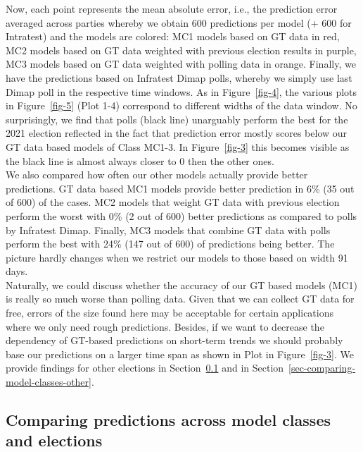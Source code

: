 \documentclass[
  letterpaper,
  DIV=11,
  numbers=noendperiod]{scrartcl}
\begin{document}
Now, each point represents the mean absolute error, i.e., the prediction
error averaged across parties whereby we obtain 600 predictions per
model (+ 600 for Intratest) and the models are colored: MC1 models based
on GT data in red, MC2 models based on GT data weighted with previous
election results in purple, MC3 models based on GT data weighted with
polling data in orange. Finally, we have the predictions based on
Infratest Dimap polls, whereby we simply use last Dimap poll in the
respective time windows. As in Figure~\ref{fig-4}, the various plots in
Figure~\ref{fig-5} (Plot 1-4) correspond to different widths of the data
window. No surprisingly, we find that polls (black line) unarguably
perform the best for the 2021 election reflected in the fact that
prediction error mostly scores below our GT data based models of Class
MC1-3. In Figure~\ref{fig-3} this becomes visible as the black line is
almost always closer to 0 then the other ones.\\
We also compared how often our other models actually provide better
predictions. GT data based MC1 models provide better prediction in 6\%
(35 out of 600) of the cases. MC2 models that weight GT data with
previous election perform the worst with 0\% (2 out of 600) better
predictions as compared to polls by Infratest Dimap. Finally, MC3 models
that combine GT data with polls perform the best with 24\% (147 out of
600) of predictions being better. The picture hardly changes when we
restrict our models to those based on width 91 days.\\
Naturally, we could discuss whether the accuracy of our GT based models
(MC1) is really so much worse than polling data. Given that we can
collect GT data for free, errors of the size found here may be
acceptable for certain applications where we only need rough
predictions. Besides, if we want to decrease the dependency of GT-based
predictions on short-term trends we should probably base our predictions
on a larger time span as shown in Plot in Figure~\ref{fig-3}. We provide
findings for other elections in
Section~\ref{sec-comparison-models-elections} and in
Section~\ref{sec-comparing-model-classes-other}.

\hypertarget{sec-comparison-models-elections}{%
\subsection{Comparing predictions across model classes and
elections}\label{sec-comparison-models-elections}}
\end{document}
